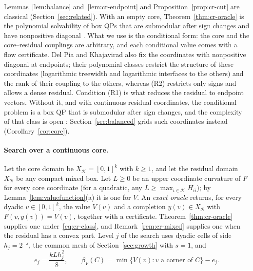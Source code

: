 \begin{remark}\label{rem:cr-cut-prior}
Lemmas~\ref{lem:balance} and~\ref{lem:cr-endpoint} and
Proposition~\ref{prop:cr-cut} are classical (Section~\ref{sec:related}).
With an empty core, Theorem~\ref{thm:cr-oracle} is the polynomial
solvability of box QPs that are submodular after sign changes and have
nonpositive diagonal \cite{Padberg1989,BurerNatarajanWillemsen2026v3}. What
we use is the conditional form: the core and the core--residual couplings
are arbitrary, and each conditional value comes with a flow certificate.
Del Pia and Khajavirad also fix the coordinates with nonpositive diagonal at
endpoints; their polynomial classes \cite[Theorem~4]{DelPiaKhajavirad2026}
restrict the structure of these coordinates (logarithmic treewidth and
logarithmic interfaces to the others) and the rank of their coupling to the
others, whereas (R2) restricts only signs and allows a dense residual.
Condition (R1) is what reduces the residual to endpoint vectors. Without it,
and with continuous residual coordinates, the conditional problem is a box
QP that is submodular after sign changes, and the complexity of that class
is open \cite[footnote~2]{BurerNatarajanWillemsen2026v3};
Section~\ref{sec:balanced} grids such coordinates instead
(Corollary~\ref{cor:core}).
\end{remark}

\paragraph{Search over a continuous core.}
Let the core domain be $X_{\mathcal K}=[0,1]^k$ with $k\ge1$, and let the
residual domain $X_{\mathcal R}$ be any compact mixed box. Let $L\ge0$ be an
upper coordinate curvature of $F$ for every core coordinate (for a
quadratic, any $L\ge\max_{i\in\mathcal K}H_{ii}$); by
Lemma~\ref{lem:valuefunction}(a) it is one for $V$. An \emph{exact oracle}
returns, for every dyadic $v\in[0,1]^k$, the value $V(v)$ and a completion
$y(v)\in X_{\mathcal R}$ with $F(v,y(v))=V(v)$, together with a certificate.
Theorem~\ref{thm:cr-oracle} supplies one under~\eqref{eq:cr-class}, and
Remark~\ref{rem:cr-mixed} supplies one when the residual has a convex part.
Level $j$ of the search uses dyadic cells of side $h_j=2^{-j}$, the common
mesh of Section~\ref{sec:growth} with $s=1$, and
\[
e_j=\frac{kLh_j^2}8,\qquad
\beta_V(C)=\min\{V(v):v\text{ a corner of }C\}-e_j .
\]

